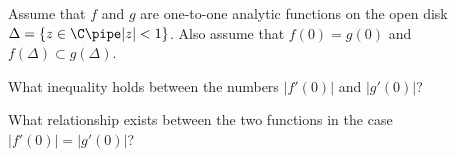 Assume that $f$ and $g$ are one-to-one analytic functions on the open
disk $\Delta=\{z\in \C\pipe |z|<1\}$. Also assume that $f(0)=g(0)$ and
$f(\Delta)\subset g(\Delta)$.
\begin{alist}
\item What inequality holds between the numbers $|f'(0)|$ and
$|g'(0)|$?
\item What relationship exists between the two functions in the case
$|f'(0)|=|g'(0)|$?
\end{alist}

